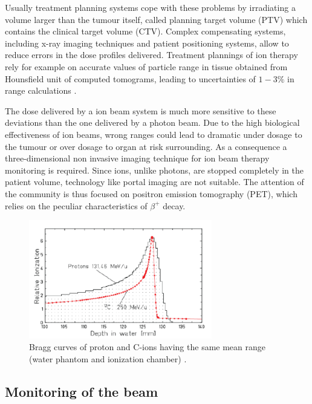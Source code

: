 Usually treatment planning systems cope with these problems by irradiating a volume larger than the tumour itself, called planning target volume (PTV) which contains the clinical target volume (CTV). Complex compensating systems, including x-ray imaging techniques and patient positioning systems, allow to reduce errors in the dose profiles delivered. 
Treatment plannings of ion therapy rely for example on accurate values of particle range in tissue obtained from Hounsfield unit of computed tomograms, leading to uncertainties of $1-3\%$ in range calculations \cite{Enghardt2004}.

The dose delivered by a ion beam system is much more sensitive to these deviations than the one delivered by a photon beam. Due to the high biological effectiveness of ion beams, wrong ranges could lead to dramatic under dosage to the tumour or over dosage to organ at risk surrounding.
As a consequence a three-dimensional non invasive imaging technique for ion beam therapy monitoring is required. Since ions, unlike photons, are stopped completely in the patient volume, technology like portal imaging are not suitable. The attention of the community is thus focused on positron emission tomography (PET), which relies on the peculiar characteristics of $\beta ^{+}$ decay.

\begin{figure} 
\centering 
\includegraphics[width=8cm]{Pictures/Chapter_1/range_scatter.pdf}
\caption[Peak spread for Carbon]{Bragg curves of proton and C-ions having the same mean range (water phantom and ionization chamber) \cite{Schardt2007}.}
\label{fig:spread}
\end{figure}

\subsection{Monitoring of the beam}

